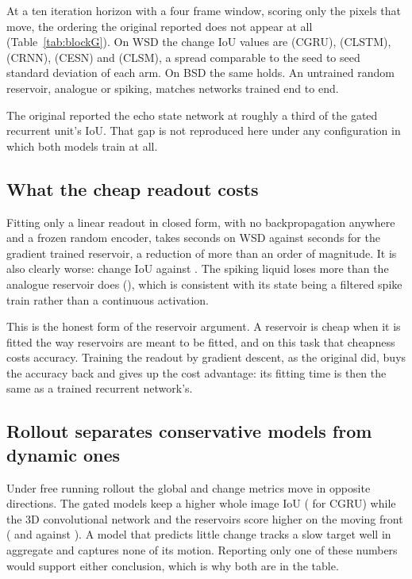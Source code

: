At a ten iteration horizon with a four frame window, scoring only the pixels
that move, the ordering the original reported does not appear at all
(Table~\ref{tab:blockG}). On WSD the change IoU values are
\Gwsdgruchangeiou{} (CGRU), \Gwsdlstmchangeiou{} (CLSTM),
\Gwsdrnnchangeiou{} (CRNN), \Gwsdesnchangeiou{} (CESN) and
\Gwsdlsmchangeiou{} (CLSM), a spread comparable to the seed to seed standard
deviation of each arm. On BSD the same holds. An untrained random reservoir,
analogue or spiking, matches networks trained end to end.

The original reported the echo state network at roughly a third of the gated
recurrent unit's IoU. That gap is not reproduced here under any configuration
in which both models train at all.

\subsection{What the cheap readout costs}

Fitting only a linear readout in closed form, with no backpropagation anywhere
and a frozen random encoder, takes \Gwsdesnridgefitseconds{} seconds on WSD
against \Gwsdesnfitseconds{} seconds for the gradient trained reservoir, a
reduction of more than an order of magnitude. It is also clearly worse:
\Gwsdesnridgechangeiou{} change IoU against \Gwsdesnchangeiou{}. The spiking
liquid loses more than the analogue reservoir does
(\Gwsdlsmridgechangeiou{}), which is consistent with its state being a
filtered spike train rather than a continuous activation.

This is the honest form of the reservoir argument. A reservoir is cheap when it
is fitted the way reservoirs are meant to be fitted, and on this task that
cheapness costs accuracy. Training the readout by gradient descent, as the
original did, buys the accuracy back and gives up the cost advantage: its
fitting time is then the same as a trained recurrent network's.

\subsection{Rollout separates conservative models from dynamic ones}

Under free running rollout the global and change metrics move in opposite
directions. The gated models keep a higher whole image IoU
(\Gwsdgrurolloutiou{} for CGRU) while the 3D convolutional network and the
reservoirs score higher on the moving front (\GwsdTdcnnrolloutchangeiou{}
and \Gwsdesnrolloutchangeiou{} against \Gwsdgrurolloutchangeiou{}). A model
that predicts little change tracks a slow target well in aggregate and captures
none of its motion. Reporting only one of these numbers would support either
conclusion, which is why both are in the table.

